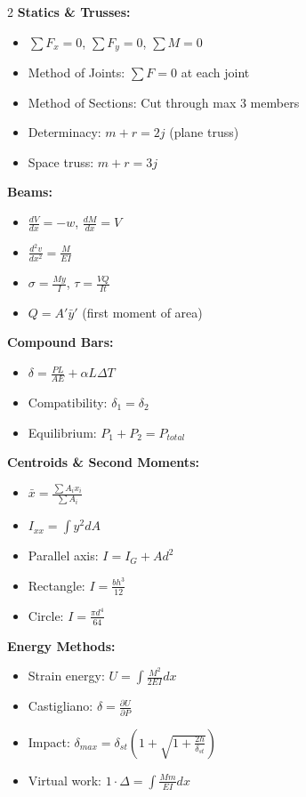 \documentclass[12pt,a4paper]{article}
\begin{document}
\begin{tcolorbox}[colback=white,colframe=examblue,title=\bfseries MECHANICS FORMULA SHEET]
\small
\begin{multicols}{2}
\textbf{Statics \& Trusses:}
\begin{itemize}
    \item $\sum F_x = 0$, $\sum F_y = 0$, $\sum M = 0$
    \item Method of Joints: $\sum F = 0$ at each joint
    \item Method of Sections: Cut through max 3 members
    \item Determinacy: $m + r = 2j$ (plane truss)
    \item Space truss: $m + r = 3j$
\end{itemize}

\textbf{Beams:}
\begin{itemize}
    \item $\frac{dV}{dx} = -w$, $\frac{dM}{dx} = V$
    \item $\frac{d^2v}{dx^2} = \frac{M}{EI}$
    \item $\sigma = \frac{My}{I}$, $\tau = \frac{VQ}{It}$
    \item $Q = A'\bar{y}'$ (first moment of area)
\end{itemize}

\textbf{Compound Bars:}
\begin{itemize}
    \item $\delta = \frac{PL}{AE} + \alpha L\Delta T$
    \item Compatibility: $\delta_1 = \delta_2$
    \item Equilibrium: $P_1 + P_2 = P_{total}$
\end{itemize}

\textbf{Centroids \& Second Moments:}
\begin{itemize}
    \item $\bar{x} = \frac{\sum A_i x_i}{\sum A_i}$
    \item $I_{xx} = \int y^2 dA$
    \item Parallel axis: $I = I_G + Ad^2$
    \item Rectangle: $I = \frac{bh^3}{12}$
    \item Circle: $I = \frac{\pi d^4}{64}$
\end{itemize}

\textbf{Energy Methods:}
\begin{itemize}
    \item Strain energy: $U = \int\frac{M^2}{2EI}dx$
    \item Castigliano: $\delta = \frac{\partial U}{\partial P}$
    \item Impact: $\delta_{max} = \delta_{st}(1+\sqrt{1+\frac{2h}{\delta_{st}}})$
    \item Virtual work: $1\cdot\Delta = \int\frac{Mm}{EI}dx$
\end{itemize}


\end{multicols}
\end{tcolorbox}
\end{document}
